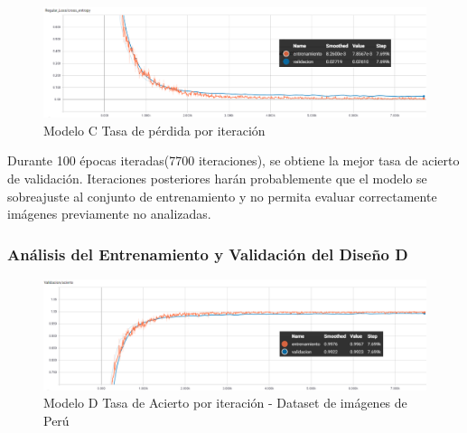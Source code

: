 			
			\begin{figure}[H]
				\begin{center}
				\includegraphics[width=1\textwidth]{images/desarrollo/trainResults/peru/model4Loss} 
				\end{center}
				\begin{center}
				\caption{\small{Modelo C Tasa de pérdida por iteración}}
				
				{\small{\fontsize{10}{16.8}\selectfont {Fuente: Elaboración propia}}}
				\end{center}
				\vspace{-1.5em}
			\end{figure}

			Durante 100 épocas iteradas(7700 iteraciones), se obtiene la mejor tasa de acierto de validación. Iteraciones posteriores harán probablemente que el modelo se sobreajuste al conjunto de entrenamiento y no permita evaluar correctamente imágenes previamente no analizadas.

		\subsubsection{Análisis del Entrenamiento y Validación del Diseño D} 
			\begin{figure}[H]
				\begin{center}
				\includegraphics[width=1\textwidth]{images/desarrollo/trainResults/peru/model6Acierto} 
				\end{center}
				\begin{center}
				\caption{\small{Modelo D Tasa de Acierto por iteración - Dataset de imágenes de Perú  }}
				
				{\small{\fontsize{10}{16.8}\selectfont {Fuente: Elaboración propia}}}
				\end{center}
				\vspace{-1.5em}
			\end{figure}
			
